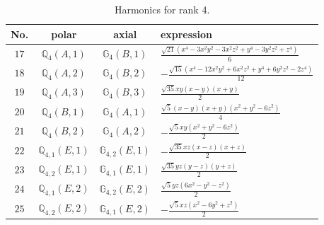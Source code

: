 \documentclass[fleqn,8pt,landscape]{jsarticle}
\begin{document}
\begin{table}[ht!]
\begin{center}
\caption{Harmonics for rank 4.}
\renewcommand{\arraystretch}{1.3}
\begin{tabular}{cccl} \hline \hline
No. & polar & axial & expression \\ \hline
$ 17 $ & $ \mathbb{Q}_{4}(A,1) $ & $ \mathbb{G}_{4}(B,1) $ & $ \frac{\sqrt{21} \left(x^{4} - 3 x^{2} y^{2} - 3 x^{2} z^{2} + y^{4} - 3 y^{2} z^{2} + z^{4}\right)}{6} $ \\
$ 18 $ & $ \mathbb{Q}_{4}(A,2) $ & $ \mathbb{G}_{4}(B,2) $ & $ - \frac{\sqrt{15} \left(x^{4} - 12 x^{2} y^{2} + 6 x^{2} z^{2} + y^{4} + 6 y^{2} z^{2} - 2 z^{4}\right)}{12} $ \\
$ 19 $ & $ \mathbb{Q}_{4}(A,3) $ & $ \mathbb{G}_{4}(B,3) $ & $ \frac{\sqrt{35} x y \left(x - y\right) \left(x + y\right)}{2} $ \\
$ 20 $ & $ \mathbb{Q}_{4}(B,1) $ & $ \mathbb{G}_{4}(A,1) $ & $ \frac{\sqrt{5} \left(x - y\right) \left(x + y\right) \left(x^{2} + y^{2} - 6 z^{2}\right)}{4} $ \\
$ 21 $ & $ \mathbb{Q}_{4}(B,2) $ & $ \mathbb{G}_{4}(A,2) $ & $ - \frac{\sqrt{5} x y \left(x^{2} + y^{2} - 6 z^{2}\right)}{2} $ \\
$ 22 $ & $ \mathbb{Q}_{4,1}(E,1) $ & $ \mathbb{G}_{4,2}(E,1) $ & $ - \frac{\sqrt{35} x z \left(x - z\right) \left(x + z\right)}{2} $ \\
$ 23 $ & $ \mathbb{Q}_{4,2}(E,1) $ & $ \mathbb{G}_{4,1}(E,1) $ & $ \frac{\sqrt{35} y z \left(y - z\right) \left(y + z\right)}{2} $ \\
$ 24 $ & $ \mathbb{Q}_{4,1}(E,2) $ & $ \mathbb{G}_{4,2}(E,2) $ & $ \frac{\sqrt{5} y z \left(6 x^{2} - y^{2} - z^{2}\right)}{2} $ \\
$ 25 $ & $ \mathbb{Q}_{4,2}(E,2) $ & $ \mathbb{G}_{4,1}(E,2) $ & $ - \frac{\sqrt{5} x z \left(x^{2} - 6 y^{2} + z^{2}\right)}{2} $ \\
 \hline \hline
\end{tabular}
\end{center}
\end{table}
\end{document}
